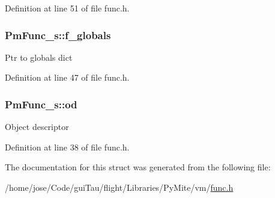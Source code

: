 Definition at line 51 of file func.\-h.

\hypertarget{struct_pm_func__s_a5c76e923890548c2c21ec754021e7d99}{
\subsubsection[{f\-\_\-globals}]{ Pm\-Func\-\_\-s\-::f\-\_\-globals}}\label{struct_pm_func__s_a5c76e923890548c2c21ec754021e7d99}
Ptr to globals dict 

Definition at line 47 of file func.\-h.

\hypertarget{struct_pm_func__s_a31675a6ad3c18e06eb77c12c3d7bb1de}{
\subsubsection[{od}]{ Pm\-Func\-\_\-s\-::od}}\label{struct_pm_func__s_a31675a6ad3c18e06eb77c12c3d7bb1de}
Object descriptor 

Definition at line 38 of file func.\-h.



The documentation for this struct was generated from the following file\-:\begin{DoxyCompactItemize}
\item 
/home/jose/\-Code/gui\-Tau/flight/\-Libraries/\-Py\-Mite/vm/\hyperlink{func_8h}{func.\-h}\end{DoxyCompactItemize}
